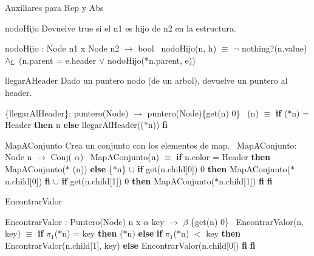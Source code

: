 \begin{DoxyVerb}Auxiliares para Rep y Abs
\end{DoxyVerb}


\begin{DoxyParagraph}{nodo\+Hijo}
Devuelve true si el n1 es hijo de n2 en la estructura.

nodo\+Hijo \+: Node n1 x Node n2 $\to$ bool~\newline
nodo\+Hijo(n, h) $\equiv$ $\lnot$ nothing?(n.\+value) $\land_{\rm L}$ (n.\+parent = e.\+header $\lor$ nodo\+Hijo($\ast$n.parent, e)) 
\end{DoxyParagraph}


\begin{DoxyParagraph}{llegar\+A\+Header}
Dado un puntero nodo (de un arbol), devuelve un puntero al header.

\{llegar\+Al\+Header\}\+: puntero(\+Node) $\to$ puntero(\+Node)\{get(n)  0\}~\newline
(n) $\equiv$ {\bfseries if} ($\ast$n) = Header {\bfseries then} n {\bfseries else} llegar\+Al\+Header(($\ast$n)) {\bfseries fi} 


\end{DoxyParagraph}
\begin{DoxyParagraph}{Map\+A\+Conjunto}
Crea un conjunto con los elementos de map.~\newline
 Map\+A\+Conjunto\+: Node n $\to$ Conj( $\alpha$)~\newline
Map\+A\+Conjunto(n) $\equiv$ {\bfseries if} n.\+color = Header {\bfseries then} Map\+A\+Conjunto($\ast$ (n)) {\bfseries else} \{$\ast$n\} $\cup$ {\bfseries if} get(n.\+child\mbox{[}0\mbox{]})  0 {\bfseries then} Map\+A\+Conjunto($\ast$n.child\mbox{[}0\mbox{]}) {\bfseries fi} $\cup$ {\bfseries if} get(n.\+child\mbox{[}1\mbox{]})  0 {\bfseries then} Map\+A\+Conjunto($\ast$n.child\mbox{[}1\mbox{]}) {\bfseries fi} {\bfseries fi} 
\end{DoxyParagraph}


\begin{DoxyParagraph}{Encontrar\+Valor}


Encontrar\+Valor \+: Puntero(\+Node) n x $\alpha$ key $\to$ $\beta$ \{get(n)  0\}~\newline
Encontrar\+Valor(n, key) $\equiv$ {\bfseries if} $\pi_1$($\ast$n) = key {\bfseries then} ($\ast$n) {\bfseries else} {\bfseries if} $\pi_1$($\ast$n) $<$ key {\bfseries then} Encontrar\+Valor(n.\+child\mbox{[}1\mbox{]}, key) {\bfseries else} Encontrar\+Valor(n.\+child\mbox{[}0\mbox{]}) {\bfseries fi} {\bfseries fi} 
\end{DoxyParagraph}


